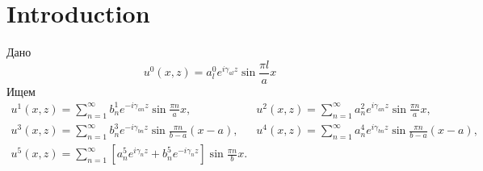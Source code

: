 \section{Introduction}

Дано
$$
	u^0(x, z) = a_l^0 e^{i\gamma_{al}z}\sin{\frac{\pi l}{a}x}
$$
Ищем
$$
	\begin{array}{lr}
	u^1(x, z)=\sum\limits_{n=1}^{\infty}b_n^1e^{-i\gamma_{an}z}\sin{\frac{\pi n}{a}x},&
	u^2(x, z)=\sum\limits_{n=1}^{\infty}a_n^2e^{i\gamma_{an}z}\sin{\frac{\pi n}{a}x},\\
	u^3(x, z)=\sum\limits_{n=1}^{\infty}b_n^3e^{-i\gamma_{bn}z}\sin{\frac{\pi n}{b-a}(x-a)},&
	u^4(x, z)=\sum\limits_{n=1}^{\infty}a_n^4e^{i\gamma_{bn}z}\sin{\frac{\pi n}{b-a}(x-a)},\\
	u^5(x, z)=\sum\limits_{n=1}^{\infty}\left[a_n^5e^{i\gamma_{n}z}+b_n^5e^{-i\gamma_{n}z}\right]\sin{\frac{\pi n}{b}x}.&\\
	\end{array}
$$